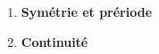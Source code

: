 \begin{enumerate}
      \item \textbf{Symétrie et prériode}
            
      \item \textbf{Continuité}
            
\end{enumerate}
